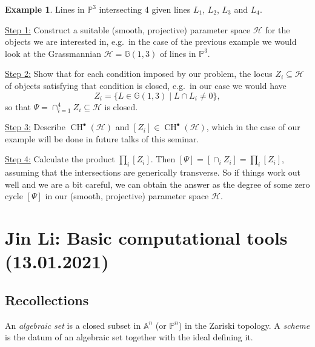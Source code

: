 \documentclass[12pt,a4paper]{amsart}
\theoremstyle{plain}
\theoremstyle{definition}
\newtheorem{exmp}[thm]{Example}
\theoremstyle{remark}
\begin{document}
\begin{exmp}
    Lines in $\mathbb{P}^{3}$ intersecting 4 given lines $L_{1}$, $L_{2}$, $L_{3}$ and $L_{4}$.
\end{exmp}

\textbullet\underline{Step 1:} Construct a suitable (smooth, projective) parameter space $\mathcal{H}$ for the objects we are interested in, e.g.~in the case of the previous example we would look at the Grassmannian $\mathcal{H}=\mathbb{G}(1,3)$ of lines in $\mathbb{P}^{3}$.

\textbullet\underline{Step 2:} Show that for each condition imposed by our problem, the locus $Z_{i}\subseteq \mathcal{H}$ of objects satisfying that condition is closed, e.g.~in our case we would have
\[ Z_{i}=\{ L\in \mathbb{G}(1,3)\mid L\cap L_{i}\neq 0 \}, \]
so that $\Psi=\cap_{i=1}^{4}Z_{i}\subseteq \mathcal{H}$ is closed.

\textbullet\underline{Step 3:} Describe $\operatorname{CH}^{\bullet}(\mathcal{H})$ and $[Z_{i}]\in \operatorname{CH}^{\bullet}(\mathcal{H})$, which in the case of our example will be done in future talks of this seminar.

\textbullet\underline{Step 4:} Calculate the product $\prod_{i}[Z_{i}]$.
Then $[\Psi]=[\cap_{i}Z_{i}]=\prod_{i}[Z_{i}]$, assuming that the intersections are generically transverse.
So if things work out well and we are a bit careful, we can obtain the answer as the degree \cite[Propostion 1.21]{eh16} of some zero cycle $[\Psi]$ in our (smooth, projective) parameter space $\mathcal{H}$.

\section{Jin Li: Basic computational tools (13.01.2021)}

\subsection{Recollections}

An \textit{algebraic set} is a closed subset in $\mathbb{A}^{n}$ (or $\mathbb{P}^{n}$) in the Zariski topology.
A \textit{scheme} is the datum of an algebraic set together with the ideal defining it.
\end{document}
